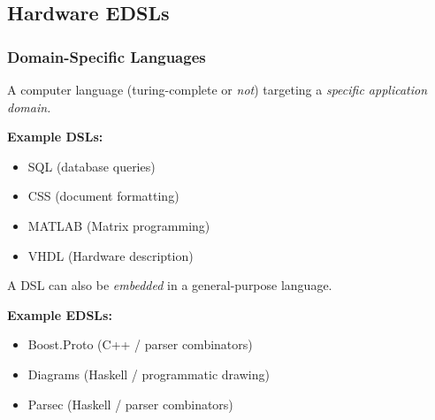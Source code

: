     \subsection{Hardware EDSLs}
    \label{subsec:hardware-edsls}
        \begin{frame}
            \frametitle{Domain-Specific Languages}

            \par{A computer language (turing-complete or \emph{not}) targeting a \emph{specific application domain.}}
            \par{\textbf{Example DSLs:}}
            \begin{itemize}
                \item SQL (database queries)
                \item CSS (document formatting)
                \item MATLAB (Matrix programming)
                \item VHDL (Hardware description)
            \end{itemize}

            \pause

            \vspace{0.3cm}
            \par{A DSL can also be \emph{embedded} in a general-purpose language.}
            \par{\textbf{Example EDSLs:}}
            \begin{itemize}
                \item Boost.Proto (C++ / parser combinators)
                \item Diagrams (Haskell / programmatic drawing)
                \item Parsec (Haskell / parser combinators)
            \end{itemize}
        \end{frame}


